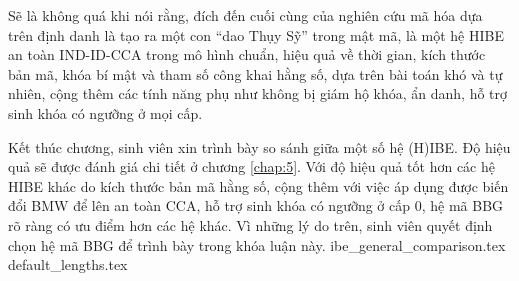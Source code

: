 \documentclass[class=report, crop=false]{standalone}
\begin{document}
		Sẽ là không quá khi nói rằng, đích đến cuối cùng của nghiên cứu mã hóa dựa trên định danh là tạo ra một con ``dao Thụy Sỹ'' trong mật mã, là một hệ HIBE an toàn IND-ID-CCA trong mô hình chuẩn, hiệu quả về thời gian, kích thước bản mã, khóa bí mật và tham số công khai hằng số, dựa trên bài toán khó và tự nhiên, cộng thêm các tính năng phụ như không bị giám hộ khóa, ẩn danh, hỗ trợ sinh khóa có ngưỡng ở mọi cấp.

		Kết thúc chương, sinh viên xin trình bày so sánh giữa một số hệ (H)IBE. Độ hiệu quả sẽ được đánh giá chi tiết ở chương \ref{chap:5}. Với độ hiệu quả tốt hơn các hệ HIBE khác do kích thước bản mã hằng số, cộng thêm với việc áp dụng được biến đổi BMW để lên an toàn CCA, hỗ trợ sinh khóa có ngưỡng ở cấp 0, hệ mã BBG rõ ràng có ưu điểm hơn các hệ khác. Vì những lý do trên, sinh viên quyết định chọn hệ mã BBG để trình bày trong khóa luận này.
		\newpage
		{ibe_general_comparison.tex}
	{default_lengths.tex}
\end{document}

